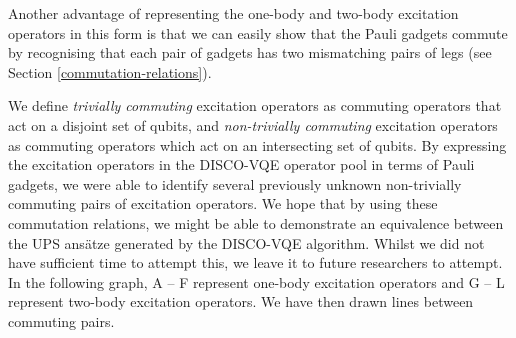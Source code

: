 Another advantage of representing the one-body and two-body excitation operators in this form is that we can easily show that the Pauli gadgets commute by recognising that each pair of gadgets has two mismatching pairs of legs (see Section \ref{commutation-relations}).


We define \textit{trivially commuting} excitation operators as commuting operators that act on a disjoint set of qubits, and \textit{non-trivially commuting} excitation operators as commuting operators which act on an intersecting set of qubits. By expressing the excitation operators in the DISCO-VQE operator pool in terms of Pauli gadgets, we were able to identify several previously unknown non-trivially commuting pairs of excitation operators. We hope that by using these commutation relations, we might be able to demonstrate an equivalence between the UPS ansätze generated by the DISCO-VQE algorithm. Whilst we did not have sufficient time to attempt this, we leave it to future researchers to attempt. In the following graph, A -- F represent one-body excitation operators and G -- L represent two-body excitation operators. We have then drawn lines between commuting pairs.

